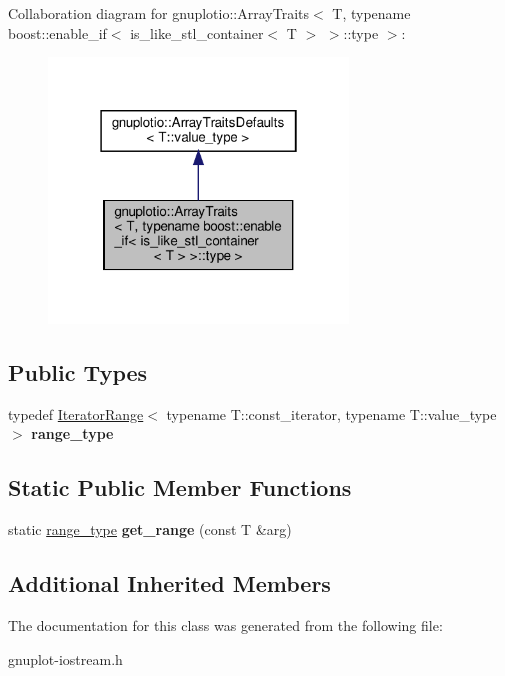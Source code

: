 Collaboration diagram for gnuplotio\+:\+:Array\+Traits$<$ T, typename boost\+:\+:enable\+\_\+if$<$ is\+\_\+like\+\_\+stl\+\_\+container$<$ T $>$ $>$\+:\+:type $>$\+:
\nopagebreak
\begin{figure}[H]
\begin{center}
\leavevmode
\includegraphics[width=226pt]{classgnuplotio_1_1ArrayTraits_3_01T_00_01typename_01boost_1_1enable__if_3_01is__like__stl__conta4401937b8251776f9383339a7f86e7bc}
\end{center}
\end{figure}
\subsection*{Public Types}
\begin{DoxyCompactItemize}
\item 
\mbox{\label{classgnuplotio_1_1ArrayTraits_3_01T_00_01typename_01boost_1_1enable__if_3_01is__like__stl__conta99f8c9e80e271bc1ed047cdd05794af4_ab702072abbe018bbc90b9967ca8c4b42}} 
typedef \hyperlink{classgnuplotio_1_1IteratorRange}{Iterator\+Range}$<$ typename T\+::const\+\_\+iterator, typename T\+::value\+\_\+type $>$ {\bfseries range\+\_\+type}
\end{DoxyCompactItemize}
\subsection*{Static Public Member Functions}
\begin{DoxyCompactItemize}
\item 
\mbox{\label{classgnuplotio_1_1ArrayTraits_3_01T_00_01typename_01boost_1_1enable__if_3_01is__like__stl__conta99f8c9e80e271bc1ed047cdd05794af4_a89d4150ab3c479cde972071a10acd27b}} 
static \hyperlink{classgnuplotio_1_1IteratorRange}{range\+\_\+type} {\bfseries get\+\_\+range} (const T \&arg)
\end{DoxyCompactItemize}
\subsection*{Additional Inherited Members}


The documentation for this class was generated from the following file\+:\begin{DoxyCompactItemize}
\item 
gnuplot-\/iostream.\+h\end{DoxyCompactItemize}
